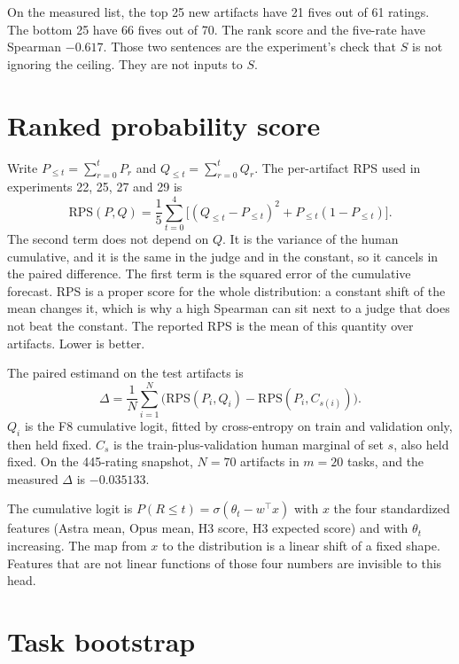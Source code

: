 \documentclass[11pt]{article}
\begin{document}
On the measured list, the top 25 new artifacts have 21 fives out of 61 ratings. The bottom 25 have 66 fives out of 70. The rank score and the five-rate have Spearman $-0.617$. Those two sentences are the experiment's check that $S$ is not ignoring the ceiling. They are not inputs to $S$.

\section*{Ranked probability score}

Write $P_{\le t}=\sum_{r=0}^{t}P_r$ and $Q_{\le t}=\sum_{r=0}^{t}Q_r$. The per-artifact RPS used in experiments 22, 25, 27 and 29 is
\begin{equation}
\boxed{\mathrm{RPS}(P,Q)=\frac{1}{5}\sum_{t=0}^{4}\Big[(Q_{\le t}-P_{\le t})^2+P_{\le t}(1-P_{\le t})\Big].}
\end{equation}
The second term does not depend on $Q$. It is the variance of the human cumulative, and it is the same in the judge and in the constant, so it cancels in the paired difference. The first term is the squared error of the cumulative forecast. RPS is a proper score for the whole distribution: a constant shift of the mean changes it, which is why a high Spearman can sit next to a judge that does not beat the constant. The reported RPS is the mean of this quantity over artifacts. Lower is better.

The paired estimand on the test artifacts is
\begin{equation}
\Delta = \frac{1}{N}\sum_{i=1}^{N}\Big(\mathrm{RPS}(P_i,Q_i)-\mathrm{RPS}(P_i,C_{s(i)})\Big).
\end{equation}
$Q_i$ is the F8 cumulative logit, fitted by cross-entropy on train and validation only, then held fixed. $C_s$ is the train-plus-validation human marginal of set $s$, also held fixed. On the 445-rating snapshot, $N=70$ artifacts in $m=20$ tasks, and the measured $\Delta$ is $-0.035133$.

The cumulative logit is $P(R\le t)=\sigma(\theta_t-w^\top x)$ with $x$ the four standardized features (Astra mean, Opus mean, H3 score, H3 expected score) and with $\theta_t$ increasing. The map from $x$ to the distribution is a linear shift of a fixed shape. Features that are not linear functions of those four numbers are invisible to this head.

\section*{Task bootstrap}
\end{document}
